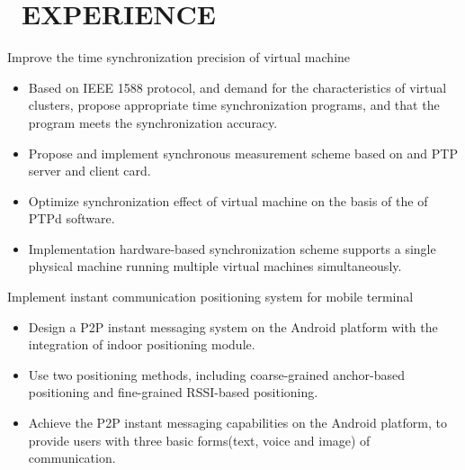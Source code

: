 \documentclass{resume}
\begin{document}
\section{\faUsers\ EXPERIENCE}
\setlength{\parindent}{2em}Improve the time synchronization precision of virtual machine
\begin{onehalfspacing}
\begin{itemize}[leftmargin=5em]
  \item Based on IEEE 1588 protocol, and demand for the characteristics of virtual clusters, propose appropriate time synchronization programs, and that the program meets the synchronization accuracy.
  \item Propose and implement synchronous measurement scheme based on and PTP server and client card.
  \item Optimize synchronization effect of virtual machine on the basis of the of PTPd software.
  \item Implementation hardware-based synchronization scheme supports a single physical machine running multiple virtual machines simultaneously.
\end{itemize}
\end{onehalfspacing}

\setlength{\parindent}{2em}Implement instant communication positioning system for mobile terminal
\begin{onehalfspacing}
\begin{itemize}[leftmargin=5em]
  \item Design a P2P instant messaging system on the Android platform with the integration of indoor positioning module.
  \item Use two positioning methods, including coarse-grained anchor-based positioning and fine-grained RSSI-based positioning.
  \item Achieve the P2P instant messaging capabilities on the Android platform, to provide users with three basic forms(text, voice and image) of communication.
\end{itemize}
\end{onehalfspacing}

\end{document}
